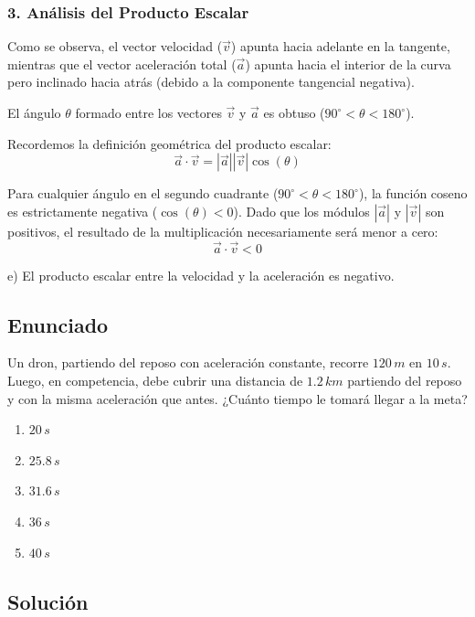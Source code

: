\documentclass[12pt, a4paper]{article}
\begin{document}
\subsubsection*{3. Análisis del Producto Escalar}
Como se observa, el vector velocidad ($\vec{v}$) apunta hacia adelante en la tangente, mientras que el vector aceleración total ($\vec{a}$) apunta hacia el interior de la curva pero inclinado hacia atrás (debido a la componente tangencial negativa).

El ángulo $\theta$ formado entre los vectores $\vec{v}$ y $\vec{a}$ es obtuso ($90^\circ < \theta < 180^\circ$).

Recordemos la definición geométrica del producto escalar:
$$ \vec{a} \cdot \vec{v} = |\vec{a}| |\vec{v}| \cos(\theta) $$

Para cualquier ángulo en el segundo cuadrante ($90^\circ < \theta < 180^\circ$), la función coseno es estrictamente negativa ($\cos(\theta) < 0$).
Dado que los módulos $|\vec{a}|$ y $|\vec{v}|$ son positivos, el resultado de la multiplicación necesariamente será menor a cero:
$$ \vec{a} \cdot \vec{v} < 0 $$

\begin{tcolorbox}[colback=green!5!white, colframe=green!50!black, title=Respuesta Final]
\centering \Large e) El producto escalar entre la velocidad y la aceleración es negativo.
\end{tcolorbox}

\newpage

\subsection*{Enunciado}
Un dron, partiendo del reposo con aceleración constante, recorre $120 \, \si{m}$ en $10 \, \si{s}$. Luego, en competencia, debe cubrir una distancia de $1.2 \, \si{km}$ partiendo del reposo y con la misma aceleración que antes. ¿Cuánto tiempo le tomará llegar a la meta?

\begin{enumerate}[label=\alph*)]
    \item $20 \, \si{s}$
    \item $25.8 \, \si{s}$
    \item $31.6 \, \si{s}$
    \item $36 \, \si{s}$
    \item $40 \, \si{s}$
\end{enumerate}

\subsection*{Solución}
\end{document}
